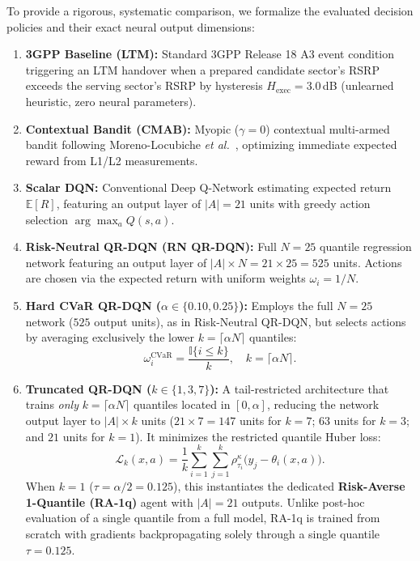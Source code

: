 \documentclass{ieeetmlcn}
\begin{document}
To provide a rigorous, systematic comparison, we formalize the evaluated decision policies and their exact neural output dimensions:
\begin{enumerate}
    \item \textbf{3GPP Baseline (LTM):} Standard 3GPP Release 18 A3 event condition triggering an LTM handover when a prepared candidate sector's RSRP exceeds the serving sector's RSRP by hysteresis $H_{\text{exec}} = 3.0$\,dB (unlearned heuristic, zero neural parameters).
    \item \textbf{Contextual Bandit (CMAB):} Myopic ($\gamma = 0$) contextual multi-armed bandit following Moreno-Locubiche \textit{et al.}~\cite{cmab_ho}, optimizing immediate expected reward from L1/L2 measurements.
    \item \textbf{Scalar DQN:} Conventional Deep Q-Network estimating expected return $\mathbb{E}[R]$, featuring an output layer of $|A| = 21$ units with greedy action selection $\arg\max_a Q(s,a)$.
    \item \textbf{Risk-Neutral QR-DQN (RN QR-DQN):} Full $N=25$ quantile regression network featuring an output layer of $|A| \times N = 21 \times 25 = 525$ units. Actions are chosen via the expected return with uniform weights $\omega_i = 1/N$.
    \item \textbf{Hard CVaR QR-DQN ($\alpha \in \{0.10, 0.25\}$):} Employs the full $N=25$ network ($525$ output units), as in Risk-Neutral QR-DQN, but selects actions by averaging exclusively the lower $k = \lceil\alpha N\rceil$ quantiles:
    \begin{equation}
    \omega_i^{\mathrm{CVaR}} = \frac{\mathbb{I}\{i\le k\}}{k}, \quad k = \lceil\alpha N\rceil.
    \label{eq:cvar}
    \end{equation}
    \item \textbf{Truncated QR-DQN ($k \in \{1, 3, 7\}$):} A tail-restricted architecture that trains \emph{only} $k = \lceil\alpha N\rceil$ quantiles located in $[0, \alpha]$, reducing the network output layer to $|A| \times k$ units ($21 \times 7 = 147$ units for $k=7$; $63$ units for $k=3$; and $21$ units for $k=1$). It minimizes the restricted quantile Huber loss:
    \begin{equation}
    \mathcal{L}_k(x,a) = \frac{1}{k}\sum_{i=1}^{k}\sum_{j=1}^{k} \rho^{\kappa}_{\tau_i}\!\big(y_j - \theta_i(x,a)\big).
    \label{eq:qr-lossk}
    \end{equation}
    When $k=1$ ($\tau = \alpha/2 = 0.125$), this instantiates the dedicated \textbf{Risk-Averse 1-Quantile (RA-1q)} agent with $|A| = 21$ outputs. Unlike post-hoc evaluation of a single quantile from a full model, RA-1q is trained from scratch with gradients backpropagating solely through a single quantile  $\tau=0.125$.

\end{enumerate}
\end{document}
